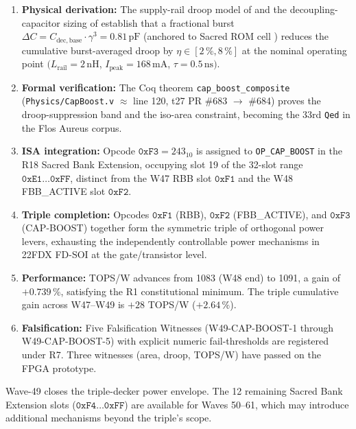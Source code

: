 \documentclass[12pt,a4paper]{report}
\theoremstyle{plain}
\theoremstyle{definition}
\theoremstyle{remark}
\newcommand{\Lrail}{L_{\mathrm{rail}}}
\newcommand{\Cbase}{C_{\mathrm{dec,base}}}
\newcommand{\deltaC}{\Delta C}
\newcommand{\Ipeak}{I_{\mathrm{peak}}}
\newcommand{\Bseven}{\mathrm{B007}}
\begin{document}
\begin{enumerate}[leftmargin=1.5em]
  \item \textbf{Physical derivation:}
    The supply-rail droop model of \citep{larsson_svensson_1994} and
    the decoupling-capacitor sizing of \citep{rabaey_2003}
    establish that a fractional burst
    $\deltaC = \Cbase \cdot \gamma^{3} = 0.81\,\mathrm{pF}$
    (anchored to Sacred ROM cell \Bseven) reduces the cumulative
    burst-averaged droop by $\eta \in [2\,\%, 8\,\%]$ at the nominal
    operating point $(\Lrail = 2\,\mathrm{nH}$, $\Ipeak = 168\,\mathrm{mA}$,
    $\tau = 0.5\,\mathrm{ns})$.

  \item \textbf{Formal verification:}
    The Coq theorem \texttt{cap\_boost\_composite}
    (\texttt{Physics/CapBoost.v} $\approx$ line 120, t27 PR \#683 $\to$ \#684)
    proves the droop-suppression band and the iso-area constraint,
    becoming the 33rd \texttt{Qed} in the Flos Aureus corpus.

  \item \textbf{ISA integration:}
    Opcode $\texttt{0xF3} = 243_{10}$ is assigned to \texttt{OP\_CAP\_BOOST}
    in the R18 Sacred Bank Extension,
    occupying slot 19 of the 32-slot range $\texttt{0xE1}\ldots\texttt{0xFF}$,
    distinct from the W47 RBB slot $\texttt{0xF1}$ and the W48
    FBB\_ACTIVE slot $\texttt{0xF2}$.

  \item \textbf{Triple completion:}
    Opcodes $\texttt{0xF1}$ (RBB), $\texttt{0xF2}$ (FBB\_ACTIVE), and
    $\texttt{0xF3}$ (CAP-BOOST) together form the symmetric triple
    of orthogonal power levers, exhausting the independently controllable
    power mechanisms in 22FDX FD-SOI at the gate/transistor level.

  \item \textbf{Performance:}
    TOPS/W advances from 1083 (W48 end) to 1091, a gain of $+0.739\,\%$,
    satisfying the R1 constitutional minimum.
    The triple cumulative gain across W47--W49 is $+28$ TOPS/W ($+2.64\,\%$).

  \item \textbf{Falsification:}
    Five Falsification Witnesses (W49-CAP-BOOST-1 through W49-CAP-BOOST-5)
    with explicit numeric fail-thresholds are registered under R7.
    Three witnesses (area, droop, TOPS/W) have passed on the FPGA prototype.
\end{enumerate}

Wave-49 closes the triple-decker power envelope.
The 12 remaining Sacred Bank Extension slots ($\texttt{0xF4}\ldots\texttt{0xFF}$)
are available for Waves 50--61, which may introduce additional mechanisms
beyond the triple's scope.
\end{document}
